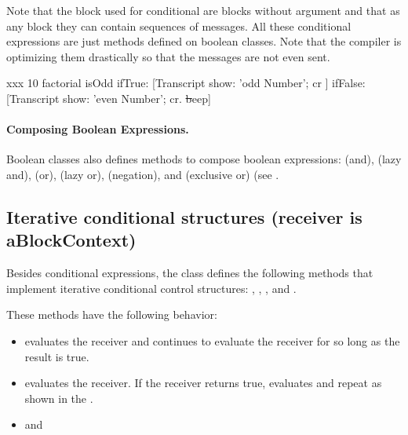 \documentclass[a4paper,10pt,twoside]{book}
\begin{document}
Note that the block used for conditional are blocks without argument and that as any block they can contain sequences of messages. All these conditional expressions are just methods defined on boolean classes. Note that the compiler is optimizing them drastically so that the messages are not even sent. 


\begin{script}[xxx]{xxx}
10 factorial isOdd
   ifTrue: [Transcript show: 'odd Number'; cr ]
   ifFalse: [Transcript show: 'even Number'; cr. 
                \st beep]
\end{script}

\paragraph{Composing Boolean Expressions.}
Boolean classes also defines methods to compose boolean expressions: 
\index{\lct{\&}} (and), 
  (lazy and),  
\index{|}   (or), 
   (lazy or), 
 (negation), 
and (exclusive or) (see . 

\subsection{Iterative conditional structures (receiver is aBlockContext)}
\label{sec:loopCondition}
Besides conditional expressions, the class  defines the following methods that implement  iterative conditional control structures:      ,  , , and  .

These methods have the following behavior: 
\begin{itemize}
\item {} evaluates the receiver and continues to evaluate the receiver for so long as the result is true.
\item {} evaluates the receiver. If the receiver returns true, evaluates  and repeat as shown in the .
\item {} and  
\end{itemize}
\end{document}
